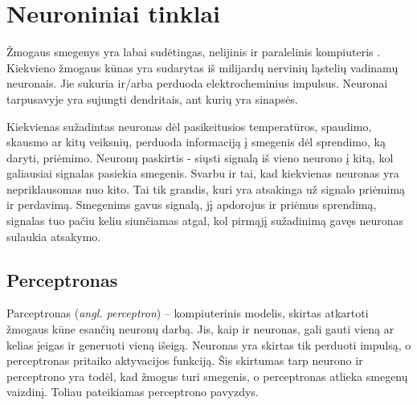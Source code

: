 \documentclass{VUMIFPSbakalaurinis}
\begin{document}
\section{Neuroniniai tinklai}
Žmogaus smegenys yra labai sudėtingas, nelijinis ir paralelinis kompiuteris \cite{Hay09}. Kiekvieno žmogaus kūnas yra sudarytas iš milijardų nervinių ląstelių vadinamų neuronais. Jie sukuria ir/arba perduoda elektrocheminius impulsus. Neuronai tarpusavyje yra sujungti dendritais, ant kurių yra sinapsės. 

Kiekvienas sužadintas neuronas dėl pasikeitusios temperatūros, spaudimo, skausmo ar kitų veiksnių, perduoda informaciją į smegenis dėl sprendimo, ką daryti, priėmimo. Neuronų paskirtis - siųsti signalą iš vieno neurono į kitą, kol galiausiai signalas pasiekia smegenis. Svarbu ir tai, kad kiekvienas neuronas yra nepriklausomas nuo kito. Tai tik grandis, kuri yra atsakinga už signalo priėmimą ir perdavimą. Smegenims gavus signalą, jį apdorojus ir priėmus sprendimą, signalas tuo pačiu keliu siunčiamas atgal, kol pirmąjį sužadinimą gavęs neuronas sulaukia atsakymo. 

\subsection{Perceptronas}

Parceptronas (\textit{angl. perceptron}) – kompiuterinis modelis, skirtas atkartoti žmogaus kūne esančių neuronų darbą. Jis, kaip ir neuronas, gali gauti vieną ar kelias įeigas ir generuoti vieną išeigą. Neuronas yra skirtas tik perduoti impulsą, o perceptronas pritaiko aktyvacijos funkciją. Šis skirtumas tarp neurono ir perceptrono yra todėl, kad žmogus turi smegenis, o perceptronas atlieka smegenų vaizdinį. Toliau pateikiamas perceptrono pavyzdys.
\end{document}
